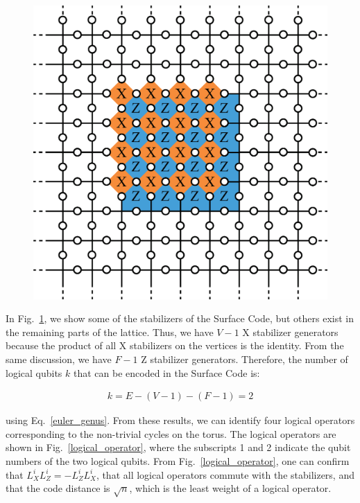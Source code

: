 \documentclass[a4paper,11pt]{ltjsarticle}
\begin{document}
{{        \begin{figure}[h]
            \centering
            \includegraphics[scale=0.40]{figure/local.eps}
            \vspace{0pt}\caption{}
            \label{local}
            \vspace{-10pt}
        \end{figure}
    
        In Fig.~\ref{local}, we show some of the stabilizers of the Surface Code, but others exist in the remaining parts of the lattice. Thus, we have $V - 1$ X stabilizer generators because the product of all X stabilizers on the vertices is the identity. From the same discussion, we have $F - 1$ Z stabilizer generators. Therefore, the number of logical qubits $k$ that can be encoded in the Surface Code is:

    \begin{align}
        k = E - (V - 1) - (F - 1) = 2
    \end{align} 

    using Eq.~\ref{euler_genus}. From these results, we can identify four logical operators corresponding to the non-trivial cycles on the torus. The logical operators are shown in Fig.~\ref{logical_operator}, where the subscripts 1 and 2 indicate the qubit numbers of the two logical qubits. From Fig.~\ref{logical_operator}, one can confirm that $L^i_XL^i_Z = -L^i_ZL^i_X$, that all logical operators commute with the stabilizers, and that the code distance is $\sqrt{n}$, which is the least weight of a logical operator. 

}}
\end{document}
